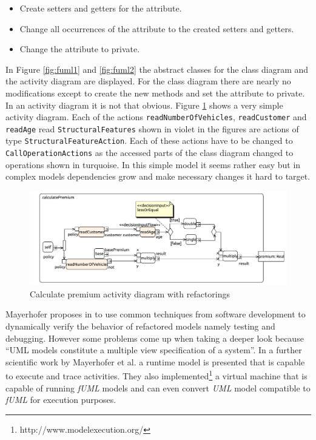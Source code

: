 \documentclass{llncs}
\begin{document}
\begin{itemize}
 \item Create setters and getters for the attribute.
 \item Change all occurrences of the attribute to the created setters and getters.
 \item Change the attribute to private.
\end{itemize}

In Figure \ref{fig:fuml1} and \ref{fig:fuml2} the abstract classes for the class diagram and the activity diagram are displayed. For the class diagram there are nearly no modifications except to create the new methods and set the attribute to private. In an activity diagram it is not that obvious. Figure \ref{fig:calculatePremiumRef} shows a very simple activity diagram. Each of the actions \lstinline|readNumberOfVehicles|, \lstinline|readCustomer| and \lstinline|readAge| read \lstinline|StructuralFeatures| shown in violet in the figures are actions of type \lstinline|StructuralFeatureAction|. Each of these actions have to be changed to \lstinline|CallOperationActions| as the accessed parts of the class diagram changed to operations shown in turquoise. In this simple model it seems rather easy but in complex models dependencies grow and make necessary changes it hard to target.

\begin{figure}[h!t]
 \centering
 \includegraphics[scale=0.5]{images/insurance_ref/Activity_calculatePremium_calculatePremium}
 \caption{Calculate premium activity diagram with refactorings}
 \label{fig:calculatePremiumRef}
\end{figure}

Mayerhofer proposes in \cite{DBLP:conf/icse/Mayerhofer12} to use common techniques from software development to dynamically verify the behavior of refactored models namely testing and debugging. However some problems come up when taking a deeper look because ``UML models constitute a multiple view specification of a system''. In a further scientific work by Mayerhofer et al. \cite{DBLP:conf/models/MayerhoferLK12} a runtime model is presented that is capable to execute and trace activities. They also implemented\footnote{http://www.modelexecution.org/} a virtual machine that is capable of running \textit{fUML} models and can even convert \textit{UML} model compatible to \textit{fUML} for execution purposes.
\end{document}
